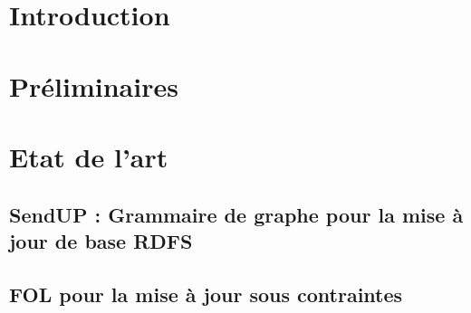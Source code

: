 \section{Introduction}


\section{Préliminaires}


\section{Etat de l'art}


\subsection{SendUP : Grammaire de graphe pour la mise à jour de base RDFS}
\label{sec:update:soa:sendup}


\subsection{FOL pour la mise à jour sous contraintes}
\label{sec:update:soa:updchase}

